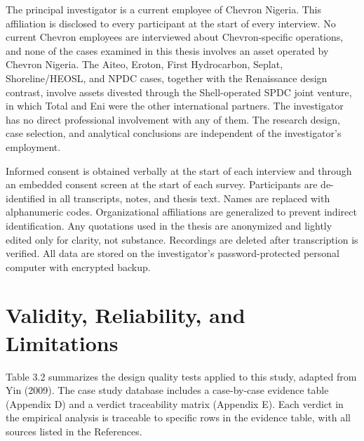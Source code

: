 \documentclass[twoside,fontset=lmodern]{mitthesis}
\begin{document}
The principal investigator is a current employee of Chevron Nigeria.
This affiliation is disclosed to every participant at the start of every
interview. No current Chevron employees are interviewed about
Chevron-specific operations, and none of the cases examined in this
thesis involves an asset operated by Chevron Nigeria. The Aiteo, Eroton,
First Hydrocarbon, Seplat, Shoreline/HEOSL, and NPDC cases, together
with the Renaissance design contrast, involve assets divested through
the Shell-operated SPDC joint venture, in which Total and Eni were the
other international partners. The investigator has no direct
professional involvement with any of them. The research design, case
selection, and analytical conclusions are independent of the
investigator's employment.

Informed consent is obtained verbally at the start of each interview and
through an embedded consent screen at the start of each survey.
Participants are de-identified in all transcripts, notes, and thesis
text. Names are replaced with alphanumeric codes. Organizational
affiliations are generalized to prevent indirect identification. Any
quotations used in the thesis are anonymized and lightly edited only for
clarity, not substance. Recordings are deleted after transcription is
verified. All data are stored on the investigator's password-protected
personal computer with encrypted backup.

\hypertarget{validity-reliability-and-limitations}{%
\section{Validity, Reliability, and
Limitations}\label{validity-reliability-and-limitations}}

Table 3.2 summarizes the design quality tests applied to this study,
adapted from Yin (2009). The case study database includes a case-by-case
evidence table (Appendix D) and a verdict traceability matrix (Appendix
E). Each verdict in the empirical analysis is traceable to specific rows
in the evidence table, with all sources listed in the References.
\end{document}
